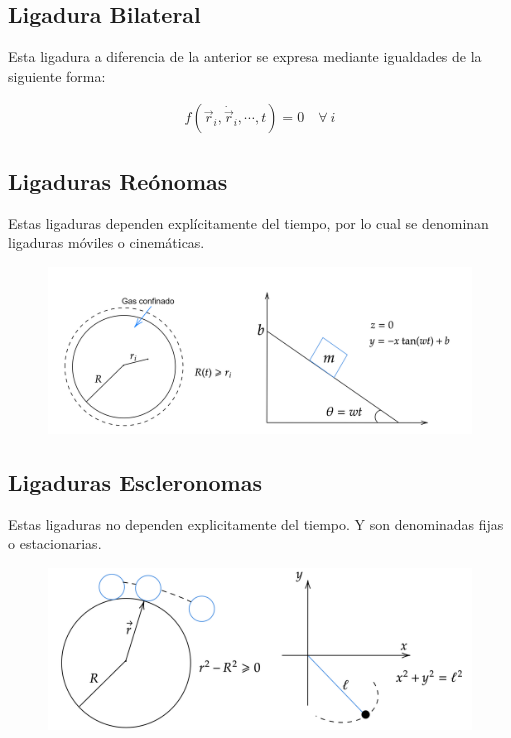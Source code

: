 \documentclass[../main]{subfiles}
\begin{document}
\subsection*{Ligadura Bilateral}
Esta ligadura a diferencia de la anterior se expresa mediante igualdades de la siguiente forma:

\begin{align}
    f(\vec{r}_i, \dot{\vec{r}}_i, \cdots, t) = 0 \quad \forall \ i
\end{align}

\subsection*{Ligaduras Reónomas}

Estas ligaduras dependen explícitamente del tiempo, por lo cual se denominan ligaduras móviles o cinemáticas.

    \begin{figure}[h]
        \centering
        \includegraphics[scale=0.15]{Física Clásica/MECA 2/images/lig3.png}
        \label{fig:fig4}
    \end{figure}

\subsection*{Ligaduras Escleronomas}

Estas ligaduras no dependen explicitamente del tiempo. Y son denominadas fijas o estacionarias.

    \begin{figure}
        \centering
        \includegraphics[scale=0.22]{Física Clásica/MECA 2/images/lig4.png}
        \label{fig:fig5}
    \end{figure}
    
\end{document}

